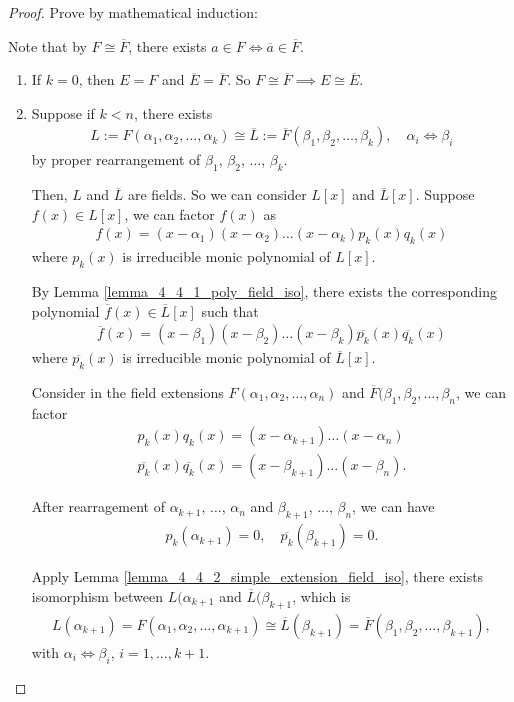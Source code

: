 \documentclass[utf8]{ctexbook}
\begin{document}
\begin{proof}
Prove by mathematical induction:

Note that by $F \cong \overline{F}$, there exists $a \in F \iff \overline{a} \in \overline{F}$.

\begin{enumerate}
\item{If $k=0$, then $E = F$ and $\overline{E} = \overline{F}$. So $F \cong \overline{F} \implies E \cong \overline{E}$.}
\item{Suppose if $k < n$, there exists
\begin{align*}
L := F(\alpha_1, \alpha_2, \ldots, \alpha_k) \cong \overline{L} := \overline{F}(\beta_1, \beta_2, \ldots, \beta_k) , \quad \alpha_i \iff \beta_i 
\end{align*}
by proper rearrangement of $\beta_1$, $\beta_2$, $\ldots$, $\beta_k$.

Then, $L$ and $\overline{L}$ are fields. So we can consider $L[x]$ and $\overline{L}[x]$. Suppose $f(x) \in L[x]$, we can factor $f(x)$ as
\begin{align*}
f(x) = (x- \alpha_1) (x - \alpha_2) \ldots (x - \alpha_k) p_k (x) q_k (x)
\end{align*}
where $p_k (x)$ is irreducible monic polynomial of $L[x]$.

By Lemma \ref{lemma_4_4_1_poly_field_iso}, there exists the corresponding polynomial $\overline{f} (x) \in \overline{L}[x]$ such that
\begin{align*}
\overline{f}(x) = (x - \beta_1) (x - \beta_2) \ldots (x - \beta_k) \overline{p_k} (x) \overline{q_k} (x)
\end{align*}
where $\overline{p_k} (x)$ is irreducible monic polynomial of $\overline{L}[x]$.

Consider in the field extensions $F(\alpha_1, \alpha_2, \ldots , \alpha_n)$ and $\overline{F}(\beta_1, \beta_2, \ldots , \beta_n$, we can factor
\begin{align*}
p_k(x) q_k(x) = (x- \alpha_{k+1}) \ldots (x - \alpha_{n} ) \\
\overline{p_k} (x) \overline{q_k} (x) = (x - \beta_{k+1} ) \ldots (x - \beta_{n}) .
\end{align*}

After rearragement of $\alpha_{k+1}$, $\ldots$, $\alpha_{n}$ and $\beta_{k+1}$, $\ldots$, $\beta_{n}$, we can have
\begin{align*}
p_k (\alpha_{k+1} ) = 0, \quad \overline{p_k} (\beta_{k+1} ) = 0.
\end{align*}

Apply Lemma \ref{lemma_4_4_2_simple_extension_field_iso}, there exists isomorphism between $L(\alpha_{k+1}$ and $\overline{L}(\beta_{k+1}$, which is
\begin{align*}
L(\alpha_{k+1}) = F(\alpha_1, \alpha_2, \ldots, \alpha_{k+1}) \cong \overline{L} (\beta_{k+1}) = \overline{F}(\beta_1, \beta_2, \ldots, \beta_{k+1}),
\end{align*}
with $\alpha_i \iff \beta_i$, $i = 1, \ldots, k+1$.
}
\end{enumerate}

\end{proof}
\end{document}
